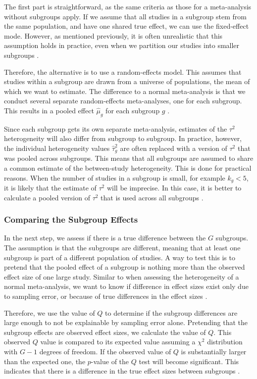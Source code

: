 \documentclass[../../../main.tex]{subfiles}
\begin{document}
The first part is straightforward, as the same criteria as those for a meta-analysis without subgroups apply. If we assume that all studies in a subgroup stem from the same population, and have one shared true effect, we can use the fixed-effect mode. However, as mentioned previously, it is often unrealistic that this assumption holds in practice, even when we partition our studies into smaller subgroups \autocite{Harrer2021}.

Therefore, the alternative is to use a random-effects model. This assumes that studies within a subgroup are drawn from a universe of populations, the mean of which we want to estimate. The difference to a normal meta-analysis is that we conduct several separate random-effects meta-analyses, one for each subgroup. This results in a pooled effect $\hat{\mu}_g$ for each subgroup $g$ \autocite{Harrer2021}.

Since each subgroup gets its own separate meta-analysis, estimates of the $\tau^2$ heterogeneity will also differ from subgroup to subgroup. In practice, however, the individual heterogeneity values $\hat{\tau}_g^2$ are often replaced with a version of $\tau^2$ that was pooled across subgroups. This means that all subgroups are assumed to share a common estimate of the between-study heterogeneity. This is done for practical reasons. When the number of studies in a subgroup is small, for example $k_g<5$, it is likely that the estimate of $\tau^2$ will be imprecise. In this case, it is better to calculate a pooled version of $\tau^2$ that is used across all subgroups \autocite{Harrer2021}.

\subsubsection{Comparing the Subgroup Effects}

In the next step, we assess if there is a true difference between the $G$ subgroups. The assumption is that the subgroups are different, meaning that at least one subgroup is part of a different population of studies. A way to test this is to pretend that the pooled effect of a subgroup is nothing more than the observed effect size of one large study. Similar to when assessing the heterogeneity of a normal meta-analysis, we want to know if difference in effect sizes exist only due to sampling error, or because of true differences in the effect sizes \autocite{Harrer2021}.

Therefore, we use the value of $Q$ to determine if the subgroup differences are large enough to not be explainable by sampling error alone. Pretending that the subgroup effects are observed effect sizes, we calculate the value of $Q$. This observed $Q$ value is compared to its expected value assuming a $\chi^2$ distribution with $G-1$ degrees of freedom. If the observed value of $Q$ is substantially larger than the expected one, the $p$-value of the $Q$ test will become significant. This indicates that there is a difference in the true effect sizes between subgroups \autocite{Harrer2021}.
\end{document}
